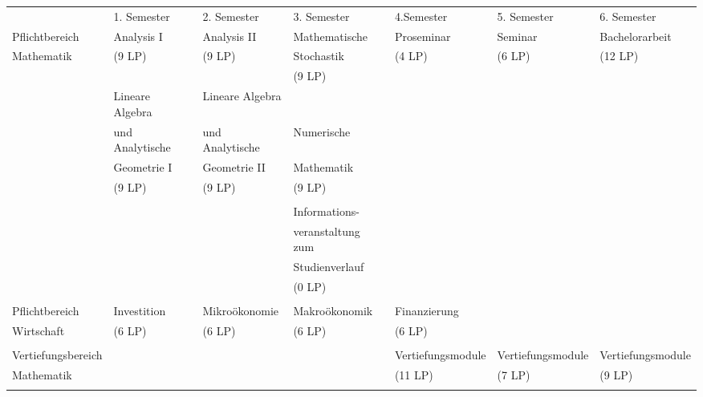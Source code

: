 \begin{center}
\begin{tabular}{||l||l|l|l|l|l|l||}
\hhline{|t:=:t:=t=t=t=t=t=:t|}
\hspace*{25mm}&1. Semester\hspace*{8ex}&2. Semester\hspace*{8ex}&3. Semester\hspace*{8ex}&4.Semester\hspace*{8ex}&5. Semester\hspace*{8ex}&6. Semester\hspace*{8ex}\\
\hhline{|:=::======:|} Pflichtbereich&Analysis I&Analysis II&Mathematische&Proseminar&Seminar&Bachelorarbeit\\
\hhline{||~||~|~|~|~|~|~||} Mathematik &(9 LP)&(9 LP)&Stochastik&(4 LP)&(6 LP)& (12 LP)\\
\hhline{||~||~|~|~|~|~|~||} &&&(9 LP)&&&\\
\hhline{||~||~|~|~|~|~|~||} &Lineare Algebra&Lineare Algebra&&&&\\ 
\hhline{||~||~|~|~|~|~|~||} &und Analytische&und Analytische&Numerische&&&\\ 
\hhline{||~||~|~|~|~|~|~||} &Geometrie I&Geometrie II&Mathematik&&&\\ 
\hhline{||~||~|~|~|~|~|~||} &(9 LP)&(9 LP)&(9 LP)&&&\\
\hhline{||~||~|~|~|~|~|~||} &&&&&&\\
\hhline{||~||~|~|~|~|~|~||} &&& Informations- &&&\\
\hhline{||~||~|~|~|~|~|~||} &&& veranstaltung zum &&&\\
\hhline{||~||~|~|~|~|~|~||} &&& Studienverlauf &&&\\
\hhline{||~||~|~|~|~|~|~||} &&& (0 LP) &&&\\
\hhline{||~||~|~|~|~|~|~||} &&&&&&\\
\hhline{|:=::======:|} Pflichtbereich&Investition&Mikroökonomie&Makroökonomik&Finanzierung&&\\
\hhline{||~||~|~|~|~|~|~||} Wirtschaft&(6 LP)&(6 LP)&(6 LP)&(6 LP)&&\\
\hhline{||~||~|~|~|~|~|~||} &&&&&&\\
\hhline{|:=::======:|} Vertiefungsbereich&&&&Vertiefungsmodule&Vertiefungsmodule&Vertiefungsmodule\\
\hhline{||~||~|~|~|~|~|~||} Mathematik&&&&(11 LP)&(7 LP)&(9 LP)\\
\hhline{||~||~|~|~|~|~|~||} &&&&&&\\

\end{tabular}
\end{center}
